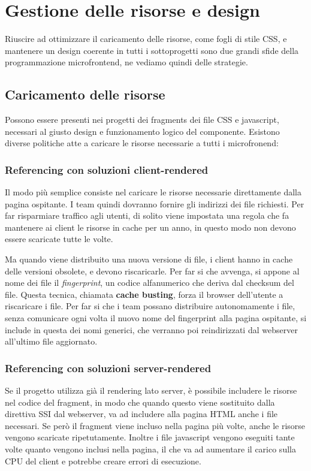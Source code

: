 \chapter{Gestione delle risorse e design}\label{ch:gestionerisorse}

Riuscire ad ottimizzare il caricamento delle risorse, come fogli di stile CSS, 
e mantenere un design coerente in tutti i sottoprogetti sono due
 grandi sfide della programmazione microfrontend, ne vediamo quindi delle strategie.


\section{Caricamento delle risorse}
Possono essere presenti nei progetti dei fragments dei file CSS e javascript, necessari
al giusto design e funzionamento logico del componente. Esistono diverse politiche 
atte a caricare le risorse necessarie a tutti i microfronend:

\subsection{Referencing con soluzioni client-rendered}
Il modo più semplice consiste nel caricare le risorse necessarie direttamente dalla pagina ospitante.
I team quindi dovranno fornire gli indirizzi dei file richiesti.
Per far risparmiare traffico agli utenti, di solito viene impostata una regola che fa mantenere ai client
le risorse in cache per un anno, in questo modo non devono essere scaricate tutte le volte.

Ma quando viene distribuito una nuova versione di file, i client hanno in cache delle versioni obsolete, e devono riscaricarle.
Per far si che avvenga, si appone al nome dei file il \emph{fingerprint}, un codice alfanumerico che deriva dal checksum del file.
Questa tecnica, chiamata \textbf{cache busting}, forza il browser dell'utente a riscaricare i file.
Per far si che i team possano distribuire autonomamente i file, senza comunicare ogni volta il nuovo nome del
fingerprint alla pagina ospitante, si include in questa dei nomi generici, che verranno poi reindirizzati dal webserver all'ultimo file aggiornato.



\subsection{Referencing con soluzioni server-rendered}
Se il progetto utilizza già il rendering lato server, è possibile includere le risorse nel codice
del fragment, in modo che quando questo viene sostituito dalla direttiva SSI dal webserver, va ad includere
alla pagina HTML anche i file necessari. Se però il fragment viene incluso nella pagina più volte, anche le risorse vengono 
scaricate ripetutamente. Inoltre i file javascript vengono eseguiti tante volte quanto vengono inclusi nella pagina,
il che va ad aumentare il carico sulla CPU del client e potrebbe creare errori di esecuzione.


